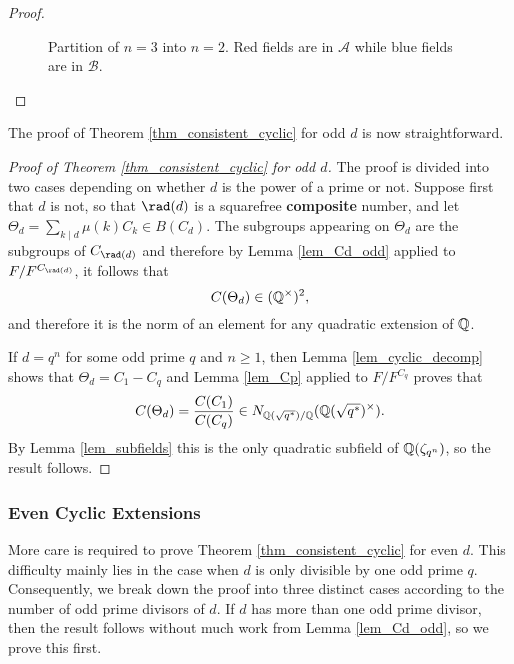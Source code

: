 \begin{proof}
\begin{figure}[!ht]
        \caption[short]{Partition of $n=3$ into $n=2$. Red fields are in $\mathcal{A}$ while blue fields are in $\mathcal{B}$.}
    \end{figure}
\end{proof}

The proof of Theorem \ref{thm_consistent_cyclic} for odd $d$ is now straightforward.

\begin{proof}[Proof of Theorem \ref{thm_consistent_cyclic} for odd $d$]
    The proof is divided into two cases depending on whether $d$ is the power of a prime or not. Suppose first that $d$ is not, so that $\rad(d)$ is a squarefree \textbf{composite} number, and let $\Theta_d=\sum_{k\mid d}\mu(k)C_k\in B(C_d)$. The subgroups appearing on $\Theta_d$ are the subgroups of $C_{\rad(d)}$ and therefore by Lemma \ref{lem_Cd_odd} applied to $F/F^{C_{\rad(d)}}$, it follows that 
    $$C(\Theta_d)\in(\mathbb{Q}^{\times})^2,$$ and therefore it is the norm of an element for any quadratic extension of $\mathbb{Q}$. 

    If $d=q^n$ for some odd prime $q$ and $n\geq1$, then Lemma \ref{lem_cyclic_decomp} shows that $\Theta_d=C_1-C_q$ and Lemma \ref{lem_Cp} applied to $F/F^{C_q}$ proves that 
    $$C(\Theta_d)=\frac{C(C_1)}{C(C_q)}\in N_{\mathbb{Q}(\sqrt{q^*})/\mathbb{Q}}(\mathbb{Q}(\sqrt{q^*})^{\times}).$$ 
    By Lemma \ref{lem_subfields} this is the only quadratic subfield of $\mathbb{Q}(\zeta_{q^n})$, so the result follows.
\end{proof}
 
\subsubsection{Even Cyclic Extensions}
More care is required to prove Theorem \ref{thm_consistent_cyclic} for even $d$. This difficulty mainly lies in the case when $d$ is only divisible by one odd prime $q$. Consequently, we break down the proof into three distinct cases according to the number of odd prime divisors of $d$. If $d$ has more than one odd prime divisor, then the result follows without much work from Lemma \ref{lem_Cd_odd}, so we prove this first.


